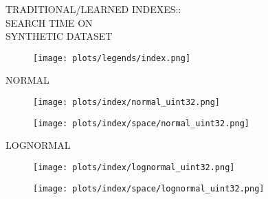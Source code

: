\documentclass{article}
\begin{document}
\begin{figure}[!htbp]
\fbox
{
\begin{minipage}[t][0.98\textheight][t]{\textwidth}
\centering
    \begin{minipage}{0.23\linewidth}
    \footnotesize{TRADITIONAL/LEARNED INDEXES::\\SEARCH TIME ON \\ SYNTHETIC DATASET}
    \end{minipage}
   \begin{minipage}{0.7\linewidth}
        \begin{figure}[H]
        \texttt{[image: plots/legends/index.png]}
        \end{figure}
    \end{minipage}
    \vspace*{-10px}

    \begin{minipage}{0.05\linewidth}
    \begin{sideways}\small NORMAL\end{sideways}
    \end{minipage}
    \begin{minipage}{0.32\linewidth}
        \begin{figure}[H]
        \texttt{[image: plots/index/normal\_uint32.png]}
        \end{figure}
    \end{minipage}
    \begin{minipage}{0.32\linewidth}
        \begin{figure}[H]
            \texttt{[image: plots/index/space/normal\_uint32.png]}
        \end{figure}
    \end{minipage}
    \vspace*{-16px}

    \begin{minipage}{0.05\linewidth}
    \begin{sideways}\small LOGNORMAL\end{sideways}
    \end{minipage}
    \begin{minipage}{0.32\linewidth}
        \begin{figure}[H]
        \texttt{[image: plots/index/lognormal\_uint32.png]}
        \end{figure}
    \end{minipage}
    \begin{minipage}{0.32\linewidth}
        \begin{figure}[H]
            \texttt{[image: plots/index/space/lognormal\_uint32.png]}
        \end{figure}
    \end{minipage}
    \vspace*{-16px}


\end{minipage}}
\end{figure}
\end{document}
